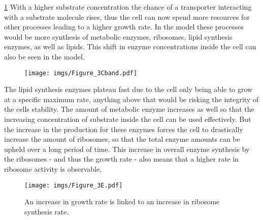 \ref{fig:Figure_3Cband} With a higher substrate concentration the chance of a transporter interacting with a substrate molecule rises, thus the cell can now spend more resources for other processes leading to a higher growth rate.
In the model these processes would be more synthesis of metabolic enzymes, ribosomes, lipid synthesis enzymes, as well as lipids. This shift in enzyme concentrations inside the cell can also be seen in the model.

\begin{figure}[H]
    \centering
    \texttt{[image: imgs/Figure\_3Cband.pdf]}
    \caption{}
    \label{fig:Figure_3Cband}
\end{figure}

The lipid synthesis enzymes plateau fast due to the cell only being able to grow at a specific maximum rate, anything above that would be risking the integrity of the cells stability. The amount of metabolic enzyme increases as well so that the increasing concentration of substrate inside the cell can be used effectively. But the increase in the production for these enzymes forces the cell to drastically increase the amount of ribosomes, so that the total enzyme amounts can be upheld over a long period of time. 
This increase in overall enzyme synthesis by the ribosomes - and thus the growth rate - also means that a higher rate in ribosome activity is observable.

\begin{figure}[H]
    \centering
    \texttt{[image: imgs/Figure\_3E.pdf]}
    \caption{An increase in growth rate is linked to an increase in ribosome synthesis rate.}
    \label{fig:Figure_3E}
\end{figure}